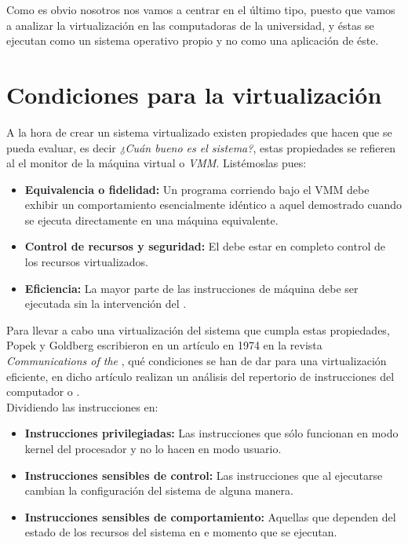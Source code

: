 Como es obvio nosotros nos vamos a centrar en el último tipo, puesto que vamos a analizar la virtualización en las computadoras de la universidad, y éstas se ejecutan como un sistema operativo propio y no como una aplicación de éste.

\section{Condiciones para la virtualización}

A la hora de crear un sistema virtualizado existen propiedades que hacen que se pueda evaluar, es decir \emph{¿Cuán bueno es el sistema?}, estas propiedades se refieren al el monitor de la máquina virtual o \emph{VMM}. Listémoslas pues:
\begin{itemize}
\item \textbf{Equivalencia o fidelidad:} Un programa corriendo bajo el VMM debe exhibir un comportamiento  esencialmente idéntico a aquel demostrado cuando se ejecuta directamente en una máquina equivalente.
\item \textbf{Control de recursos y seguridad:} El  debe estar en completo control de los recursos virtualizados.
\item \textbf{Eficiencia:} La mayor parte de las instrucciones de máquina debe ser ejecutada sin la intervención del .
\end{itemize}

Para llevar a cabo una virtualización del sistema que cumpla estas propiedades, Popek y Goldberg escribieron en un artículo en 1974 en la revista \emph{Communications of the }\cite{reqvir}, qué condiciones se han de dar para una virtualización eficiente, en dicho artículo realizan un análisis del repertorio de instrucciones del computador o \emph{}.\\

Dividiendo las instrucciones en:
\begin{itemize}
\item \textbf{Instrucciones privilegiadas:} Las instrucciones que sólo funcionan en modo kernel del procesador y no lo hacen en modo usuario.
\item \textbf{Instrucciones sensibles de control:} Las instrucciones que al ejecutarse cambian la configuración del sistema de alguna manera.
\item \textbf{Instrucciones sensibles de comportamiento:} Aquellas que dependen del estado de los recursos del sistema en e momento que se ejecutan. 
\end{itemize}

